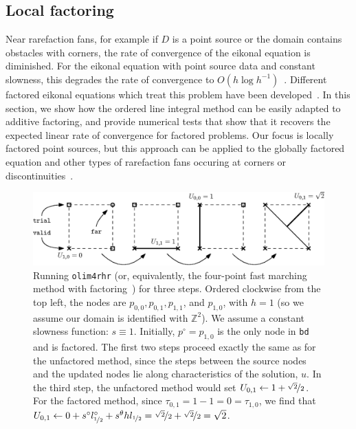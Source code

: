 \documentclass[sisc-eikonal.tex]{subfiles}
\begin{document}
\subsection{Local factoring}

Near rarefaction fans, for example if $D$ is a point source or the
domain contains obstacles with corners, the rate of convergence of the
eikonal equation is diminished. For the eikonal equation with point
source data and constant slowness, this degrades the rate of
convergence to $O(h \log h^{-1})$~\cite{qi2018corner}. Different
factored eikonal equations which treat this problem have been
developed~\cite{fomel2009fast,luo2012fast}. In this section, we show
how the ordered line integral method can be easily adapted to additive
factoring, and provide numerical tests that show that it recovers the
expected linear rate of convergence for factored problems. Our focus
is locally factored point sources, but this approach can be applied to
the globally factored equation and other types of rarefaction fans
occuring at corners or discontinuities~\cite{qi2018corner}.

\begin{figure}
  \centering
  \includegraphics{factoring-example.eps}
  \caption{Running \texttt{olim4rhr} (or, equivalently, the four-point
    fast marching method with factoring~\cite{qi2018corner}) for three
    steps. Ordered clockwise from the top left, the nodes are
    $p_{0, 0}, p_{0, 1}, p_{1, 1}$, and $p_{1, 0}$, with $h = 1$ (so
    we assume our domain is identified with $\mathbb{Z}^2$). We assume
    a constant slowness function: $s \equiv 1$. Initially,
    $p^\circ = p_{1, 0}$ is the only node in \texttt{bd} and is
    factored. The first two steps proceed exactly the same as for the
    unfactored method, since the steps between the source nodes and
    the updated nodes lie along characteristics of the solution,
    $u$. In the third step, the unfactored method would set
    $U_{0,1} \gets 1 + \nicefrac{\sqrt{2}}{2}$. For the factored
    method, since $\tau_{0,1} = 1 - 1 = 0 = \tau_{1,0}$, we find that
    $U_{0,1} \gets 0 + s^\circ l^\circ_{\nicefrac{1}{2}} + s^\theta h
    l_{\nicefrac{1}{2}} = \nicefrac{\sqrt{2}}{2} +
    \nicefrac{\sqrt{2}}{2} = \sqrt{2}$.}\label{fig:factoring-example}
\end{figure}
\end{document}
